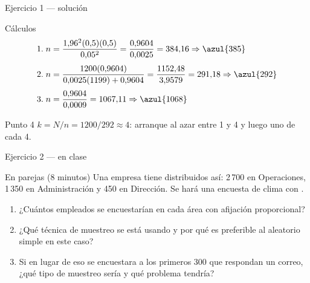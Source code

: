\documentclass[aspectratio=169,10pt]{beamer}
\begin{document}
\begin{frame}{Ejercicio 1 — solución}
  \small
  \begin{block}{Cálculos}
    \begin{align*}
      \text{1.}\;& n=\frac{1{,}96^{2}(0{,}5)(0{,}5)}{0{,}05^{2}}
                    =\frac{0{,}9604}{0{,}0025}=384{,}16 \Rightarrow \azul{385}\\[0.3em]
      \text{2.}\;& n=\frac{1200(0{,}9604)}{0{,}0025(1199)+0{,}9604}
                    =\frac{1152{,}48}{3{,}9579}=291{,}18 \Rightarrow \azul{292}\\[0.3em]
      \text{3.}\;& n=\frac{0{,}9604}{0{,}0009}=1067{,}11 \Rightarrow \azul{1068}
    \end{align*}
  \end{block}

  \begin{exampleblock}{Punto 4}
    \footnotesize
    $k=N/n=1200/292\approx 4$: arranque al azar entre 1 y 4 y luego uno de cada 4.
  \end{exampleblock}
\end{frame}

\begin{frame}{Ejercicio 2 — en clase}
  \begin{alertblock}{En parejas (8 minutos)}
    Una empresa tiene  distribuidos así: 2\,700 en
    Operaciones, 1\,350 en Administración y 450 en Dirección. Se hará una
    encuesta de clima con .

    \vspace{0.25cm}
    \begin{enumerate}
      \item ¿Cuántos empleados se encuestarían en cada área con afijación
            proporcional?
      \item ¿Qué técnica de muestreo se está usando y por qué es preferible al
            aleatorio simple en este caso?
      \item Si en lugar de eso se encuestara a los primeros 300 que respondan
            un correo, ¿qué tipo de muestreo sería y qué problema tendría?
    \end{enumerate}
  \end{alertblock}
\end{frame}
\end{document}
